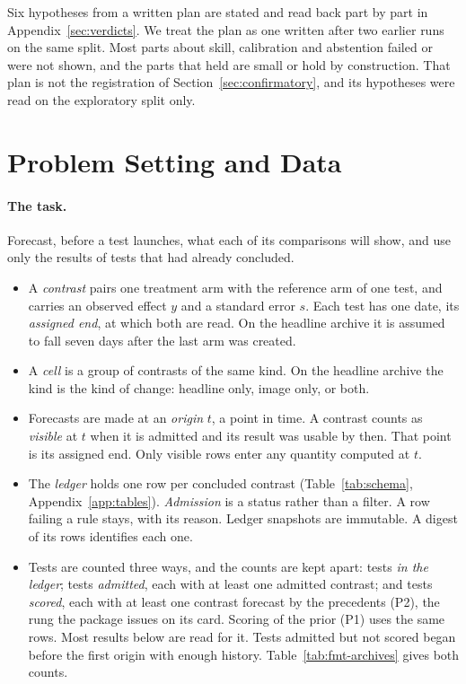 \documentclass[sigconf,nonacm]{acmart}
\newif\iftmlr
\begin{document}
\label{sec:verdict-brief}
Six hypotheses from a written plan \iftmlr (in the anonymized supplementary material)\else \cite{mootcourt2026plan}\fi{} are stated and read back part by part in Appendix~\ref{sec:verdicts}. We treat the plan as one written after two earlier runs on the same split. Most parts about skill, calibration and abstention failed or were not shown, and the parts that held are small or hold by construction. That plan is not the registration of Section~\ref{sec:confirmatory}, and its hypotheses were read on the exploratory split only.




\section{Problem Setting and Data}
\label{sec:setting}

\paragraph{The task.} Forecast, before a test launches, what each of its comparisons will show, and use only the results of tests that had already concluded.
\begin{itemize}
\item A \emph{contrast} pairs one treatment arm with the reference arm of one test, and carries an observed effect $y$ and a standard error $s$. Each test has one date, its \emph{assigned end}, at which both are read. On the headline archive it is assumed to fall seven days after the last arm was created.
\item A \emph{cell} is a group of contrasts of the same kind. On the headline archive the kind is the kind of change: headline only, image only, or both.
\item Forecasts are made at an \emph{origin} $t$, a point in time. A contrast counts as \emph{visible} at $t$ when it is admitted and its result was usable by then. That point is its assigned end. Only visible rows enter any quantity computed at $t$.
\item The \emph{ledger} holds one row per concluded contrast (Table~\ref{tab:schema}, Appendix~\ref{app:tables}). \emph{Admission} is a status rather than a filter. A row failing a rule stays, with its reason. Ledger snapshots are immutable. A digest of its rows identifies each one.
\item Tests are counted three ways, and the counts are kept apart: tests \emph{in the ledger}; tests \emph{admitted}, each with at least one admitted contrast; and tests \emph{scored}, each with at least one contrast forecast by the precedents (P2), the rung the package issues on its card. Scoring of the prior (P1) uses the same rows. Most results below are read for it. Tests admitted but not scored began before the first origin with enough history. Table~\ref{tab:fmt-archives} gives both counts.
\end{itemize}
\end{document}
